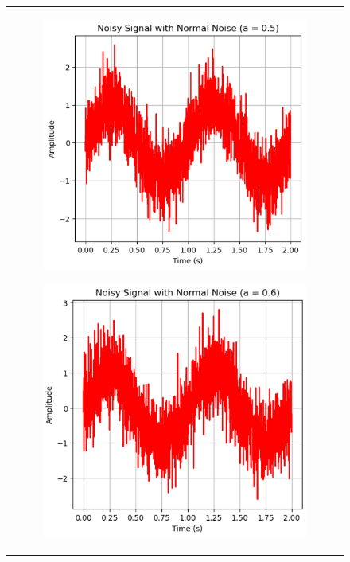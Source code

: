 \documentclass[hidelinks,12pt]{article}
\begin{document}
\begin{figure}[!h]
\begin{tabular}{c}
			\begin{subfigure}[h]{0.3\textwidth}
				\centering
				\includegraphics[width=\textwidth]{figures/normal_noise/0.5.png}
			\end{subfigure}
			\hfill
			\begin{subfigure}[h]{0.3\textwidth}
				\centering
				\includegraphics[width=\textwidth]{figures/normal_noise/0.6.png}

\end{subfigure}
\end{tabular}
\end{figure}
\end{document}
